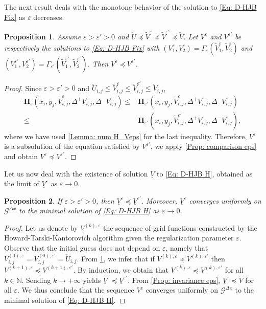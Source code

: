\documentclass[11pt]{article}
\numberwithin{equation}{section}
\numberwithin{algorithm}{section}
\newtheorem{proposition}[proposition]{Proposition}
\newcommand{\lc}{\left(}
\newcommand{\rc}{\right)}
\newcommand{\eps}{\varepsilon}
\theoremstyle{plain}
\newcommand{\D}{\Delta}
\begin{document}
The next result deals with the monotone behavior of the solution to \cref{Eq: D-HJB Fix} as $\eps$ decreases. 
\begin{proposition}\label{Prop: ordering eps}
Assume $\eps>\eps'>0$ and $\check{U}\preceq \widetilde{V}^{\eps}\preceq  \widetilde{V}^{\eps'}\preceq \check{V}$. Let ${V}^{\eps}$ and ${V}^{\eps'}$ be respectively the solutions to \cref{Eq: D-HJB Fix} with $(V^{\eps}_1,V^{\eps}_2)=\Gamma_{\eps}(\widetilde{V}^{\eps}_1,\widetilde{V}^{\eps}_2)$ and $(V^{\eps'}_1,V^{\eps'}_2)=\Gamma_{\eps'}(\widetilde{V}^{\eps'}_1,\widetilde{V}^{\eps'}_2)$. Then ${V}^{\eps}\preceq {V}^{\eps'}$.
\end{proposition}
\begin{proof}
Since $\eps>\eps'>0$ and $\check{U}_{i,j}\leq \widetilde{V}^{\eps}_{i,j}\leq \widetilde{V}^{\eps'}_{i,j}\leq \check{V}_{i,j}$,
$$
 \begin{aligned}
\boldsymbol{H}_{\eps}\lc x_i,y_j,\widetilde{V}^{\eps}_{i,j},\D^+{V^{\eps}_{i,j}},\D^-{V^{\eps}_{i,j}}\rc\leq {}&\boldsymbol{H}_{\eps'}\lc x_i,y_j,\widetilde{V}^{\eps}_{i,j},\D^+{V^{\eps}_{i,j}},\D^-{V^{\eps}_{i,j}}\rc\\
\leq {}&\boldsymbol{H}_{\eps'}\lc x_i,y_j,\widetilde{V}^{\eps'}_{i,j},\D^+{V^{\eps}_{i,j}},\D^-{V^{\eps}_{i,j}}\rc,
 \end{aligned}
$$
where we have used \cref{Lemma: num H_Veps} for the last inequality. Therefore, ${V}^{\eps}$ is a subsolution of the equation satisfied by ${V}^{\eps'}$, we apply \cref{Prop: comparison eps} and obtain ${V}^{\eps}\preceq {V}^{\eps'}$.
\end{proof}
Let us now deal with the existence of solution $\underline{V}$ to \cref{Eq: D-HJB H}, obtained as the limit of $\underline{V}^{\eps}$ as $\eps \to 0$.
\begin{proposition}\label{Prop: Tarski eps}
 If $\eps>\eps'>0$, then $\underline{V}^{\eps}\preceq \underline{V}^{\eps'}$. Moreover, $\underline{V}^{\eps}$ converges uniformly on $\mathcal{G}^{\D x}$ to the minimal solution of \cref{Eq: D-HJB H} as $\eps \to 0$. 
\end{proposition}
\begin{proof}
Let us denote by $V^{(k),\eps}$ the sequence of grid functions constructed by the Howard-Tarski-Kantorovich algorithm given the regularization parameter $\eps$. Observe that the initial guess does not depend on $\eps$, namely that $V^{(0),\eps}_{i,j}=V^{(0),\eps'}_{i,j}=\check{U}_{i,j}$. From \cref{Prop: ordering eps}, we infer that if $V^{(k),\eps}\preceq {V}^{(k),\eps'}$ then $V^{(k+1),\eps}\preceq {V}^{(k+1),\eps'}$. By induction, we obtain that $V^{(k),\eps}\preceq {V}^{(k),\eps'}$ for all $k\in \mathbb{N}$. Sending $k\to +\infty$ yields $\underline{V}^{\eps}\preceq \underline{V}^{\eps'}$. From \cref{Prop: invariance eps}, $\underline{V}^{\eps}\preceq \check{V}$ for all $\eps$. We thus conclude that the sequence $\underline{V}^{\eps}$ converges uniformly on $\mathcal{G}^{\D x}$ to the minimal solution of \cref{Eq: D-HJB H}. 
\end{proof}\par
\end{document}
